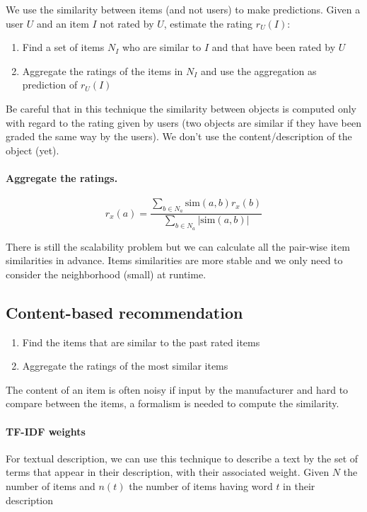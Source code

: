 We use the similarity between items (and not users) to make predictions. Given a user $U$ and an item $I$ not rated by $U$, estimate the rating $r_U(I)$:

\begin{enumerate}
  \item Find a set of items $N_I$ who are similar to $I$ and that have been rated by $U$
  \item Aggregate the ratings of the items in $N_I$ and use the aggregation as prediction of $r_U(I)$
\end{enumerate}

Be careful that in this technique the similarity between objects is computed only with regard to the rating given by users (two objects are similar if they have been graded the same way by the users). We don't use the content/description of the object (yet).

\paragraph{Aggregate the ratings.}

\[
  r_x(a) = \frac{\sum_{b\in N_a} \text{sim}(a,b) r_x(b)}{\sum_{b\in N_a} |\text{sim}(a,b)|}
\]

There is still the scalability problem but we can calculate all the pair-wise item similarities in advance. Items similarities are more stable and we only need to consider the neighborhood (small) at runtime.

\subsection{Content-based recommendation}

\begin{enumerate}
  \item Find the items that are similar to the past rated items
  \item Aggregate the ratings of the most similar items
\end{enumerate}

The content of an item is often noisy if input by the manufacturer and hard to compare between the items, a formalism is needed to compute the similarity.

\paragraph{TF-IDF weights} For textual description, we can use this technique to describe a text by the set of terms that appear in their description, with their associated weight. Given $N$ the number of items and $n(t)$ the number of items having word $t$ in their description

